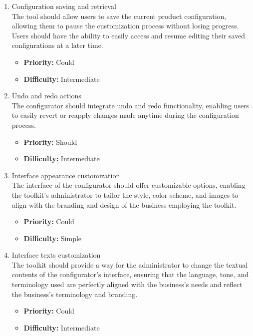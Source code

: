 \begin{enumerate}[label=\textbf{F\arabic*:}, leftmargin=*]
\item \label{itm:F12} Configuration saving and retrieval
\vspace{2pt}
\\The tool should allow users to save the current product configuration, allowing them to pause the customization process without losing progress. Users should have the ability to easily access and resume editing their saved configurations at a later time.
\begin{itemize}[noitemsep, label=\trianglebullet]
   \item \textbf{Priority:} Could
    \item \textbf{Difficulty:} Intermediate
\end{itemize}
\vspace{4pt}

\item \label{itm:F13} Undo and redo actions
\vspace{2pt}
\\The configurator should integrate undo and redo functionality, enabling users to easily revert or reapply changes made anytime during the configuration process.
\begin{itemize}[noitemsep, label=\trianglebullet]
    \item \textbf{Priority:} Should
    \item \textbf{Difficulty:} Intermediate
\end{itemize}
\vspace{4pt}

\item \label{itm:F14} Interface appearance customization
\vspace{2pt}
\\The interface of the configurator should offer customizable options, enabling the toolkit's administrator to tailor the style, color scheme, and images to align with the branding and design of the business employing the toolkit.
\begin{itemize}[noitemsep, label=\trianglebullet]
    \item \textbf{Priority:} Could
    \item \textbf{Difficulty:} Simple
\end{itemize}
\vspace{4pt}

\item \label{itm:F15} Interface texts customization
\vspace{2pt}
\\The toolkit should provide a way for the administrator to change the textual contents of the configurator's interface, ensuring that the language, tone, and terminology used are perfectly aligned with the business's needs and reflect the business's terminology and branding.
\begin{itemize}[noitemsep, label=\trianglebullet]
    \item \textbf{Priority:} Could
    \item \textbf{Difficulty:} Intermediate
\end{itemize}
\vspace{4pt}


\end{enumerate}

